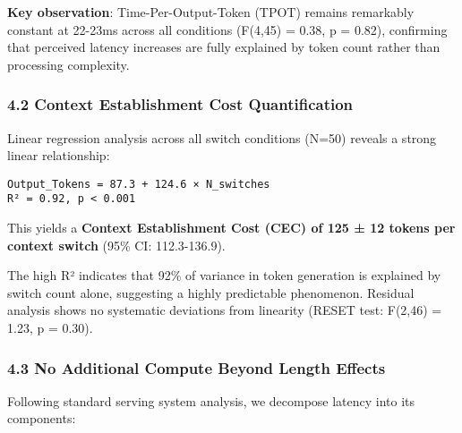 \documentclass[
  11pt]{article}
\begin{document}
\textbf{Key observation}: Time-Per-Output-Token (TPOT) remains
remarkably constant at 22-23ms across all conditions (F(4,45) = 0.38, p
= 0.82), confirming that perceived latency increases are fully explained
by token count rather than processing complexity.

\subsubsection{4.2 Context Establishment Cost
Quantification}\label{context-establishment-cost-quantification}

Linear regression analysis across all switch conditions (N=50) reveals a
strong linear relationship:

\begin{verbatim}
Output_Tokens = 87.3 + 124.6 × N_switches
R² = 0.92, p < 0.001
\end{verbatim}

This yields a \textbf{Context Establishment Cost (CEC) of 125 ± 12
tokens per context switch} (95\% CI: 112.3-136.9).

The high R² indicates that 92\% of variance in token generation is
explained by switch count alone, suggesting a highly predictable
phenomenon. Residual analysis shows no systematic deviations from
linearity (RESET test: F(2,46) = 1.23, p = 0.30).

\subsubsection{4.3 No Additional Compute Beyond Length
Effects}\label{no-additional-compute-beyond-length-effects}

Following standard serving system analysis, we decompose latency into
its components:
\end{document}

